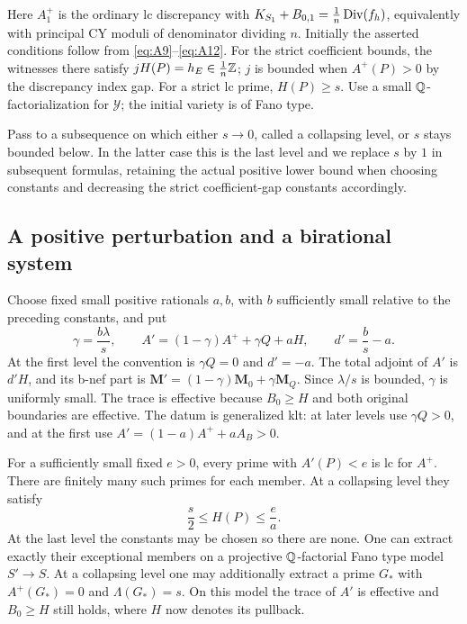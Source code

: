 Here $A_1^+$ is the ordinary lc discrepancy with
$K_{S_1}+B_{0,1}=\frac1n\operatorname{Div}(f_h)$, equivalently with principal CY moduli of
denominator dividing $n$.  Initially the asserted conditions follow
from \eqref{eq:A9}--\eqref{eq:A12}.  For the strict coefficient bounds,
the witnesses there satisfy $jH(P)=h_E\in\frac1n\mathbb Z$; $j$ is bounded
when $A^+(P)>0$ by the discrepancy index gap.  For a strict lc prime,
$H(P)\ge s$.  Use a small $\mathbb Q$-factorialization for $\mathcal Y$;
the initial variety is of Fano type.

Pass to a subsequence on which either $s\to0$, called a collapsing
level, or $s$ stays bounded below.  In the latter case this is the last
level and we replace $s$ by $1$ in subsequent formulas, retaining the
actual positive lower bound when choosing constants and decreasing
the strict coefficient-gap constants accordingly.
\subsection{A positive perturbation and a birational system}

Choose fixed small positive rationals $a,b$, with $b$ sufficiently small
relative to the preceding constants, and put
\begin{equation}\label{b:scale-perturbation}
 \gamma=\frac{b\lambda}{s},\qquad
 A'=(1-\gamma)A^++\gamma Q+aH,\qquad d'=\frac bs-a.
\end{equation}
At the first level the convention is $\gamma Q=0$ and $d'=-a$.
The total adjoint of $A'$ is $d'H$, and its b-nef part is
$\mathbf M'=(1-\gamma)\mathbf M_0+\gamma\mathbf M_Q$.
Since $\lambda/s$ is bounded, $\gamma$ is uniformly small.  The trace is
effective because $B_0\ge H$ and both original boundaries are effective.
The datum is generalized klt: at later levels use $\gamma Q>0$, and at
the first use $A'=(1-a)A^++aA_B>0$.

\begin{lemma}\label{b:scale-bad-primes}
For a sufficiently small fixed $e>0$, every prime with $A'(P)<e$ is
lc for $A^+$.  There are finitely many such primes for each member.
At a collapsing level they satisfy
\[
                 \frac s2\le H(P)\le\frac ea.
\]
At the last level the constants may be chosen so there are none.
One can extract exactly their exceptional members on a projective
$\mathbb Q$-factorial Fano type model $S'\to S$.  At a collapsing level
one may additionally extract a prime $G_*$ with $A^+(G_*)=0$ and
$\Lambda(G_*)=s$.
On this model the trace of $A'$ is effective and $B_0\ge H$ still holds,
where $H$ now denotes its pullback.
\end{lemma}

